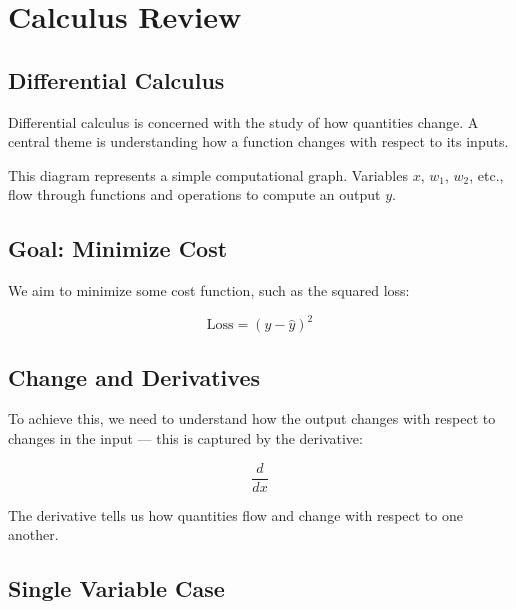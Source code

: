 \section{Calculus Review}

\subsection{Differential Calculus}

Differential calculus is concerned with the study of how quantities change. A central theme is understanding how a function changes with respect to its inputs.

\begin{center}
\end{center}

This diagram represents a simple computational graph. Variables $x$, $w_1$, $w_2$, etc., flow through functions and operations to compute an output $y$. 

\subsection{Goal: Minimize Cost}

We aim to minimize some cost function, such as the squared loss:

\[
\text{Loss} = (y - \hat{y})^2
\]

\subsection{Change and Derivatives}

To achieve this, we need to understand how the output changes with respect to changes in the input — this is captured by the derivative:

\[
\frac{d}{dx}
\]

The derivative tells us how quantities flow and change with respect to one another.

\subsection{Single Variable Case}

